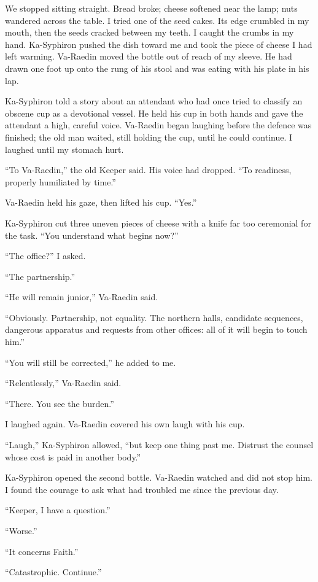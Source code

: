 We stopped sitting straight. Bread broke; cheese softened near the lamp; nuts wandered across the table. I tried one of the seed cakes. Its edge crumbled in my mouth, then the seeds cracked between my teeth. I caught the crumbs in my hand. Ka-Syphiron pushed the dish toward me and took the piece of cheese I had left warming. Va-Raedin moved the bottle out of reach of my sleeve. He had drawn one foot up onto the rung of his stool and was eating with his plate in his lap.\par

Ka-Syphiron told a story about an attendant who had once tried to classify an obscene cup as a devotional vessel. He held his cup in both hands and gave the attendant a high, careful voice. Va-Raedin began laughing before the defence was finished; the old man waited, still holding the cup, until he could continue. I laughed until my stomach hurt.\par

``To Va-Raedin,'' the old Keeper said. His voice had dropped. ``To readiness, properly humiliated by time.''\par
Va-Raedin held his gaze, then lifted his cup. ``Yes.''\par
Ka-Syphiron cut three uneven pieces of cheese with a knife far too ceremonial for the task. ``You understand what begins now?''\par
``The office?'' I asked.\par
``The partnership.''\par
``He will remain junior,'' Va-Raedin said.\par
``Obviously. Partnership, not equality. The northern halls, candidate sequences, dangerous apparatus and requests from other offices: all of it will begin to touch him.''\par
``You will still be corrected,'' he added to me.\par
``Relentlessly,'' Va-Raedin said.\par
``There. You see the burden.''\par

I laughed again. Va-Raedin covered his own laugh with his cup.\par

``Laugh,'' Ka-Syphiron allowed, ``but keep one thing past me. Distrust the counsel whose cost is paid in another body.''\par

Ka-Syphiron opened the second bottle. Va-Raedin watched and did not stop him. I found the courage to ask what had troubled me since the previous day.\par
``Keeper, I have a question.''\par
``Worse.''\par
``It concerns Faith.''\par
``Catastrophic. Continue.''\par

